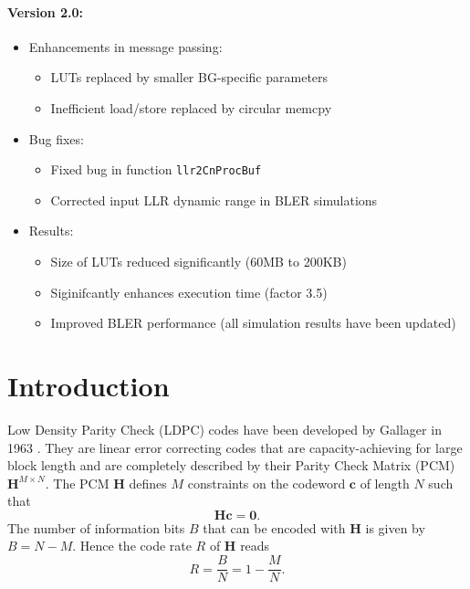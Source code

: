 \documentclass{article}
\def\0{\mathbf{0}}
\def\c{\mathbf{c}}
\def\H{\mathbf{H}}
\begin{document}
\paragraph{Version 2.0:}
\begin{itemize}
\item Enhancements in message passing:
  \begin{itemize}
  \item LUTs replaced by smaller BG-specific parameters
  \item Inefficient load/store replaced by circular memcpy
  \end{itemize}
\item Bug fixes:
  \begin{itemize}
  \item Fixed bug in function \texttt{llr2CnProcBuf}
  \item Corrected input LLR dynamic range in BLER simulations
  \end{itemize}
\item Results:
  \begin{itemize}
  \item Size of LUTs reduced significantly (60MB to 200KB)
  \item Siginifcantly enhances execution time (factor 3.5)
  \item Improved BLER performance (all simulation results have been updated)
  \end{itemize}
\end{itemize}


\newpage
\tableofcontents

\newpage
\section{Introduction}
\label{sec:introduction}

Low Density Parity Check (LDPC) codes have been developed by Gallager in 1963 \cite{gallager1962low}. They are linear error correcting codes that are capacity-achieving for large block length and are completely described by their Parity Check Matrix (PCM) $\H^{M\times N}$. The PCM $\H$ defines $M$ constraints on the codeword $\c$ of length $N$ such that
\begin{equation}
  \label{eq:29}
  \H\c = \0.
\end{equation}
The number of information bits $B$ that can be encoded with $\H$ is given by $B=N-M$. Hence the code rate $R$ of $\H$ reads
\begin{equation}
  \label{eq:37}
  R = \frac{B}{N} = 1-\frac{M}{N}.
\end{equation}
\end{document}
